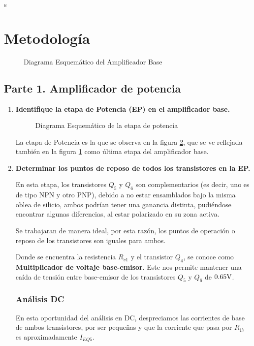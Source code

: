 s%
\section{Metodología}

\begin{figure}[H]
  \centering
  \caption{Diagrama Esquemático del Amplificador Base}
  \label{fig:amplificador_base}
\end{figure}

\subsection{Parte 1. Amplificador de potencia}
\begin{enumerate}
  \item \textbf{Identifique la etapa de Potencia (EP) en el amplificador base.}

        \begin{figure}[H]
          \centering
          \caption{Diagrama Esquemático de la  etapa de potencia}
          \label{fig:amplificador_potencia}
        \end{figure}

        La etapa de Potencia es la que se observa en la figura \ref{fig:amplificador_potencia}, que se ve reflejada también en la figura \ref{fig:amplificador_base} como última etapa del amplificador base.

  \item \textbf{Determinar los puntos de reposo de todos los transistores
          en la EP.}

        En esta etapa, los transistores  $Q_5$ y $Q_6$ son complementarios (es decir, uno es de tipo NPN y otro PNP), debido    a no estar ensamblados bajo la misma oblea de silicio, ambos podrían tener una ganancia distinta, pudiéndose encontrar algunas diferencias, al estar polarizado en su zona activa.

        Se trabajaran de manera ideal, por esta razón, los puntos de operación o reposo de los transistores son iguales para ambos.

        Donde se encuentra la resistencia $R_{v1}$ y el transistor $Q_4$, se conoce como \textbf{Multiplicador de voltaje base-emisor}. Este nos permite mantener una caída de tensión entre base-emisor de los transistores $Q_5$ y $Q_6$ de $0.65\volt$.

        \subsubsection{Análisis DC}
        En esta oportunidad del análisis en DC, despreciamos las corrientes de base de ambos transistores, por ser pequeñas y que la corriente que pasa por $R_{17}$ es aproximadamente $I_{EQ5}$.


\end{enumerate}
